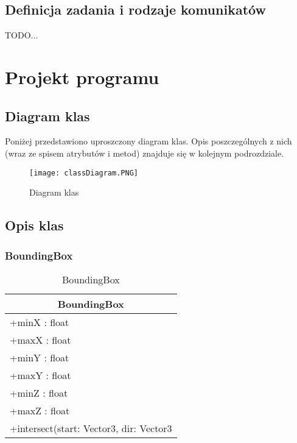 \subsection{Definicja zadania i rodzaje komunikatów}

TODO...
\newpage
\section{Projekt programu}

	\subsection{Diagram klas}
	
	Poniżej przedstawiono uproszczony diagram klas. Opis poszczególnych z nich (wraz ze spisem atrybutów i metod) znajduje się w kolejnym podrozdziale.
	
	\begin{figure}[H]
    \centering
              \texttt{[image: classDiagram.PNG]}
    \caption{Diagram klas}
    \label{fig:classDiagram}
	\end{figure}
	
	
	
\subsection{Opis klas}

\subsubsection{BoundingBox}


\footnotesize
\footnotesize
\begin{longtable}{|p{14cm}|}
	\caption{BoundingBox} \label{tab:BoundingBox} \\ \hline
	\multicolumn{1}{|c|}{BoundingBox} \\ \hline
    +minX : float \\
    +maxX : float \\
    +minY : float \\
    +maxY : float \\
    +minZ : float \\
    +maxZ : float \\ \hline
    +intersect(start: Vector3, dir: Vector3 \\ \hline
\end{longtable}
\normalsize

